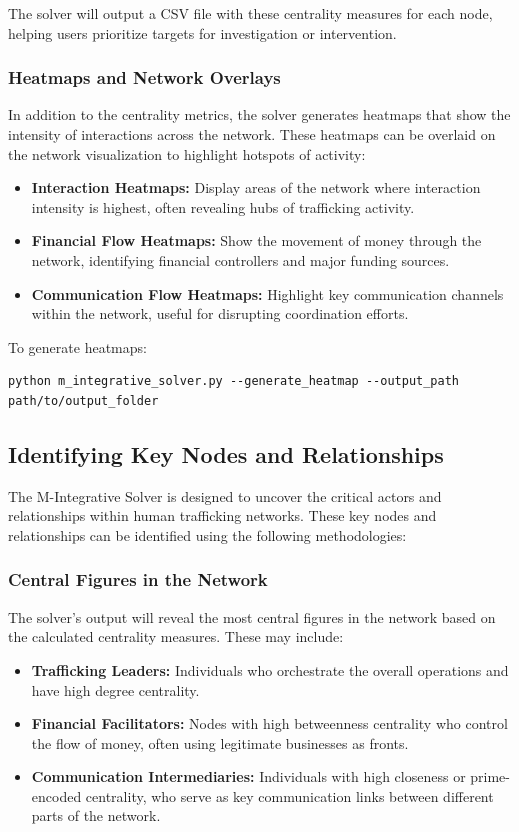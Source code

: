 \documentclass[%
 preprint, linenumbers,
 amsmath,amssymb,
 aps, physrev,
]{revtex4-2}
\begin{document}
The solver will output a CSV file with these centrality measures for each node, helping users prioritize targets for investigation or intervention.

\subsubsection{Heatmaps and Network Overlays}

In addition to the centrality metrics, the solver generates heatmaps that show the intensity of interactions across the network. These heatmaps can be overlaid on the network visualization to highlight hotspots of activity:
\begin{itemize}
    \item \textbf{Interaction Heatmaps:} Display areas of the network where interaction intensity is highest, often revealing hubs of trafficking activity.
    \item \textbf{Financial Flow Heatmaps:} Show the movement of money through the network, identifying financial controllers and major funding sources.
    \item \textbf{Communication Flow Heatmaps:} Highlight key communication channels within the network, useful for disrupting coordination efforts.
\end{itemize}

To generate heatmaps:
\begin{verbatim}
python m_integrative_solver.py --generate_heatmap --output_path path/to/output_folder
\end{verbatim}

\subsection{Identifying Key Nodes and Relationships}

The M-Integrative Solver is designed to uncover the critical actors and relationships within human trafficking networks. These key nodes and relationships can be identified using the following methodologies:

\subsubsection{Central Figures in the Network}

The solver’s output will reveal the most central figures in the network based on the calculated centrality measures. These may include:
\begin{itemize}
    \item \textbf{Trafficking Leaders:} Individuals who orchestrate the overall operations and have high degree centrality.
    \item \textbf{Financial Facilitators:} Nodes with high betweenness centrality who control the flow of money, often using legitimate businesses as fronts.
    \item \textbf{Communication Intermediaries:} Individuals with high closeness or prime-encoded centrality, who serve as key communication links between different parts of the network.
\end{itemize}
\end{document}
